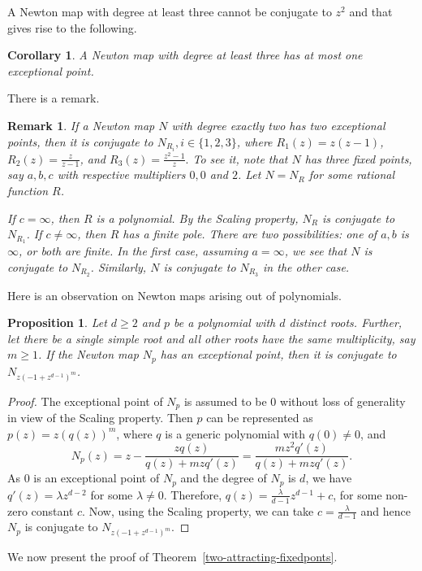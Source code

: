 \documentclass[12pt]{article}
\newtheorem{cor}{Corollary}[section]
\newtheorem{prop}{Proposition}[section]
\newtheorem{rem}{Remark}[section]
\numberwithin{equation}{section}
\begin{document}
A Newton map with degree at least three cannot be conjugate to $z^2$ and that gives rise to the following.
\begin{cor}
A Newton map with degree at least three has at most one exceptional point.
\end{cor}
There is a remark. 
\begin{rem}
	If a Newton map $N$ with degree exactly two has two exceptional points, then it is conjugate to $N_{R_i}, i \in \{1,2,3\}$, where $R_1 (z)=z(z-1)$, $R_2 (z)= \frac{z}{z-1}$, and  $R_3 (z)=\frac{z^2-1}{z}.$ To see it, note that $N$ has three fixed points, say $a,b,c$ with respective multipliers $0,0$ and $2$. Let $N=N_R$ for some rational function $R$. 
	\par If $c=\infty$, then $R$ is a polynomial. By the Scaling property, $N_R$ is conjugate to $N_{R_{1}}$. If $c \neq \infty$, then $R$ has a finite pole. There are two possibilities: one of $a, b$ is $\infty$, or both are finite. In the first case, assuming $a= \infty$, we see that $N$ is conjugate to $N_{R_2}$. Similarly, $N$ is conjugate to $N_{R_3}$ in the other case.
\end{rem}


Here is an observation on Newton maps arising out of polynomials.
\begin{prop}
	Let $d \geq 2$ and $p$ be a polynomial with $d$ distinct roots. Further, let there be a single simple root and all other roots have the same multiplicity, say $m \geq 1$. If the Newton map $N_p$ has an exceptional point, then it is conjugate to $N_{z(-1+z^{d-1})^m}$.
	\label{polynewtonmap-conj-poly}
\end{prop}
\begin{proof}
The exceptional point of $N_p$ is assumed to be $0$ without loss of generality in view of the Scaling property. Then $p$ can be represented as $p(z)=z(q(z))^m$, where $q$ is a generic polynomial with $q(0)\neq 0$, and
	$$
	N_p(z)= z-\frac{zq(z)}{q(z)+mzq'(z)}=\frac{mz^2q'(z)}{q(z)+mzq'(z)}.$$
	As $0$ is an exceptional point of $N_p$ and the degree of $N_p$ is $d$, we have $q'(z)=\lambda z^{d-2}$ for some $\lambda\neq 0$. Therefore,  $q(z)=\frac{\lambda}{d-1}z^{d-1}+c$, for some non-zero constant $c$. Now, using the Scaling property, we can take $c=\frac{\lambda}{d-1}$ and hence $N_p$ is conjugate to $N_{z(-1 +z^{d-1})^m}$.
\end{proof}
We now present the proof of Theorem~\ref{two-attracting-fixedponts}.
  
\end{document}
